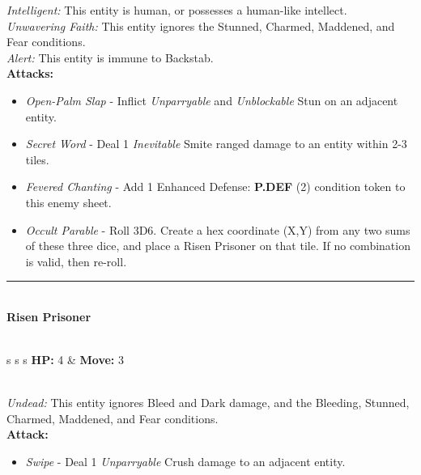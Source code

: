 \emph{Intelligent:} This entity is human, or possesses a human-like intellect.\\

\emph{Unwavering Faith:} This entity ignores the Stunned, Charmed, Maddened, and Fear conditions.\\

\emph{Alert:} This entity is immune to Backstab.\\

\textbf{Attacks:}
\begin{itemize}
\item \emph{Open-Palm Slap} - Inflict \emph{Unparryable} and \emph{Unblockable} Stun on an adjacent entity.
\item \emph{Secret Word} - Deal 1 \emph{Inevitable} Smite ranged damage to an entity within 2-3 tiles.
\item \emph{Fevered Chanting} - Add 1 Enhanced Defense: \textbf{P.DEF} (2) condition token to this enemy sheet.
\item \emph{Occult Parable} - Roll 3D6. Create a hex coordinate (X,Y) from any two sums of these three dice, and place a Risen Prisoner on that tile. If no combination is valid, then re-roll.
\end{itemize}
\hrule
\ \\
{\large \textbf{Risen Prisoner}}\\\\
\begin{tabular}{s s s}
\textbf{HP:} 4 & \textbf{Move:} 3\\
\end{tabular}\\

\emph{Undead:} This entity ignores Bleed and Dark damage, and the Bleeding, Stunned, Charmed, Maddened, and Fear conditions.\\

\textbf{Attack:}
\begin{itemize}
\item \emph{Swipe} - Deal 1 \emph{Unparryable} Crush damage to an adjacent entity.
\end{itemize}

\pagebreak

